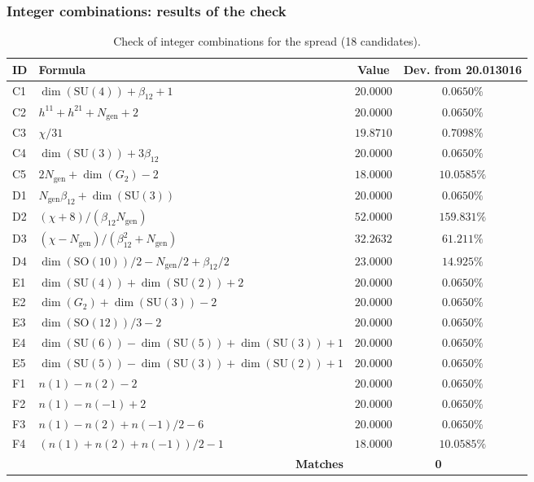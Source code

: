 \documentclass[11pt,a4paper]{article}
\newcommand{\SU}{\ensuremath{\mathrm{SU}}}
\newcommand{\SO}{\ensuremath{\mathrm{SO}}}
\theoremstyle{definition}
\begin{document}
\subsubsection{Integer combinations: results of the check}

\begin{table}[ht]
\centering
\footnotesize
\caption{Check of integer combinations for the spread (18 candidates).}
\label{tab:app-spread-integers}
\begin{tabular}{llcc}
\toprule
ID & Formula & Value & Dev. from 20.013016 \\
\midrule
C1 & $\dim(\SU(4)) + \beta_{12} + 1$ & $20.0000$ & $0.0650\%$ \\
C2 & $h^{11} + h^{21} + N_{\text{gen}} + 2$ & $20.0000$ & $0.0650\%$ \\
C3 & $\chi/31$ & $19.8710$ & $0.7098\%$ \\
C4 & $\dim(\SU(3)) + 3\beta_{12}$ & $20.0000$ & $0.0650\%$ \\
C5 & $2 N_{\text{gen}} + \dim(G_2) - 2$ & $18.0000$ & $10.0585\%$ \\
D1 & $N_{\text{gen}} \beta_{12} + \dim(\SU(3))$ & $20.0000$ & $0.0650\%$ \\
D2 & $(\chi + 8)/(\beta_{12} N_{\text{gen}})$ & $52.0000$ & $159.831\%$ \\
D3 & $(\chi - N_{\text{gen}})/(\beta_{12}^2 + N_{\text{gen}})$ & $32.2632$ & $61.211\%$ \\
D4 & $\dim(\SO(10))/2 - N_{\text{gen}}/2 + \beta_{12}/2$ & $23.0000$ & $14.925\%$ \\
E1 & $\dim(\SU(4)) + \dim(\SU(2)) + 2$ & $20.0000$ & $0.0650\%$ \\
E2 & $\dim(G_2) + \dim(\SU(3)) - 2$ & $20.0000$ & $0.0650\%$ \\
E3 & $\dim(\SO(12))/3 - 2$ & $20.0000$ & $0.0650\%$ \\
E4 & $\dim(\SU(6)) - \dim(\SU(5)) + \dim(\SU(3)) + 1$ & $20.0000$ & $0.0650\%$ \\
E5 & $\dim(\SU(5)) - \dim(\SU(3)) + \dim(\SU(2)) + 1$ & $20.0000$ & $0.0650\%$ \\
F1 & $n(1) - n(2) - 2$ & $20.0000$ & $0.0650\%$ \\
F2 & $n(1) - n(-1) + 2$ & $20.0000$ & $0.0650\%$ \\
F3 & $n(1) - n(2) + n(-1)/2 - 6$ & $20.0000$ & $0.0650\%$ \\
F4 & $(n(1) + n(2) + n(-1))/2 - 1$ & $18.0000$ & $10.0585\%$ \\
\midrule
\multicolumn{2}{r}{\textbf{Matches}} & \multicolumn{2}{c}{\textbf{0}} \\
\bottomrule
\end{tabular}
\end{table}
\end{document}
